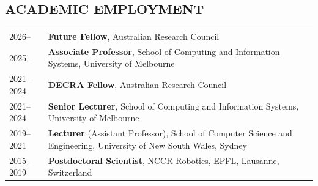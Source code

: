 
\subsection{ACADEMIC EMPLOYMENT}
\vspace{2pt}

\noindent
\begin{tabularx}{\textwidth}{@{}lX@{}}
2026--      & \textbf{Future Fellow}, Australian Research Council \\[3pt]
2025--      & \textbf{Associate Professor}, School of Computing and Information Systems, University of Melbourne \\[2pt]
2021--2024  & \textbf{DECRA Fellow}, Australian Research Council \\[2pt]
2021--2024  & \textbf{Senior Lecturer}, School of Computing and Information Systems, University of Melbourne \\[2pt]
2019--2021  & \textbf{Lecturer} (Assistant Professor), School of Computer Science and Engineering, University of New South Wales, Sydney \\[2pt]
2015--2019  & \textbf{Postdoctoral Scientist}, NCCR Robotics, EPFL, Lausanne, Switzerland \\
\end{tabularx}

